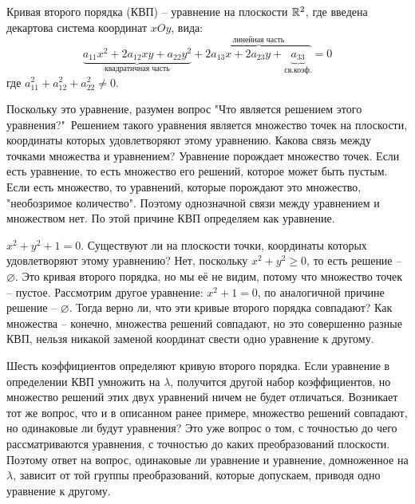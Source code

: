 	\begin{figure}[h]
		\centering
		\def\svgwidth{0.35\columnwidth}
		
	\end{figure}



	\begin{Def}
    Кривая второго порядка (КВП) -- уравнение на плоскости $\mathbb{R}^2$, где введена декартова система координат $xOy$, вида: $$\underbrace{a_{11} x^2 + 2 a_{12}xy + a_{22} y^2}_{\text{квадратичная часть}} + \overbrace{2 a_{13}x + 2 a_{23}y + \underbrace{a_{33}}_{\text{св.коэф.}}}^{\text{линейная часть}} = 0$$ 
    где $a_{11}^2 + a_{12}^2 + a_{22}^2 \neq 0$.
  \end{Def}

  Поскольку это уравнение, разумен вопрос "Что является решением этого уравнения?"\ Решением такого уравнения является множество точек на плоскости, координаты которых удовлетворяют этому уравнению.
  Какова связь между точками множества и уравнением? Уравнение порождает множество точек. Если есть уравнение, то есть множество его решений, которое может быть пустым. Если есть множество, то уравнений, которые порождают это множество, "необозримое количество". 
  Поэтому однозначной связи между уравнением и множеством нет. По этой причине КВП определяем как уравнение.

  \begin{Example}
    $x^2 + y^2 + 1 = 0$. Существуют ли на плоскости точки, координаты которых удовлетворяют этому уравнению? Нет, поскольку $x^2 + y^2 \geqslant 0$, то есть решение -- $\varnothing$. Это кривая второго порядка, но мы её не видим, потому что множество точек -- пустое. 
    Рассмотрим другое уравнение: $x^2 + 1 = 0$, по аналогичной причине решение -- $\varnothing$. Тогда верно ли, что эти кривые второго порядка совпадают? Как множества -- конечно, множества решений совпадают, но это совершенно разные КВП, нельзя никакой заменой координат свести одно уравнение к другому.
  \end{Example}

  \begin{Rem}
    Шесть коэффициентов определяют кривую второго порядка. Если уравнение в определении КВП умножить на $\lambda$, получится другой набор коэффициентов, но множество решений этих двух уравнений ничем не будет отличаться.
    Возникает тот же вопрос, что и в описанном ранее примере, множество решений совпадают, но одинаковые ли будут уравнения? Это уже вопрос о том, с точностью до чего рассматриваются уравнения, с точностью до каких преобразований плоскости.
    Поэтому ответ на вопрос, одинаковые ли уравнение и уравнение, домноженное на $\lambda$, зависит от той группы преобразований, которые допускаем, приводя одно уравнение к другому.
  \end{Rem}

